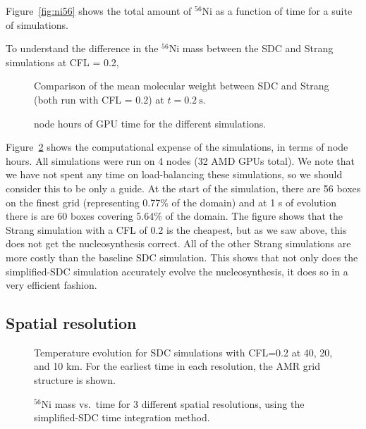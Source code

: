 \documentclass[modern]{aastex631}
\newcommand{\isot}[2]{$^{#2}\mathrm{#1}$}
\begin{document}
Figure~\ref{fig:ni56} shows the total amount of \isot{Ni}{56} as a function of time for
a suite of simulations.  

To understand the difference in the \isot{Ni}{56} mass between the SDC and Strang simulations at 
CFL = 0.2, 

\begin{figure}[t]
\centering
{}
\caption{\label{fig:abar_sdc_strang} Comparison of the mean molecular weight between SDC and Strang (both run with CFL = 0.2) at $t = 0.2~\mathrm{s}$.}
\end{figure}



\begin{figure}[t]
\centering
{}
\caption{\label{fig:cpu} node hours of GPU time for the different simulations.}
\end{figure}




Figure~\ref{fig:cpu} shows the computational expense of the
simulations, in terms of node hours.  All simulations were run on 4
nodes (32 AMD GPUs total).  We note that we have not spent any time on
load-balancing these simulations, so we should consider this to be
only a guide.  At the start of the simulation, there are 56 boxes on
the finest grid (representing 0.77\% of the domain) and at 1 s of
evolution there is are 60 boxes covering 5.64\% of the domain.  The
figure shows that the Strang simulation with a CFL of 0.2 is the
cheapest, but as we saw above, this does not get the nucleosynthesis
correct.  All of the other Strang simulations are more costly than the
baseline SDC simulation.  This shows that not only does the
simplified-SDC simulation accurately evolve the nucleosynthesis, it
does so in a very efficient fashion.

\subsection{Spatial resolution}

\begin{figure}[t]
\centering
{}
\caption{\label{fig:res_panel} Temperature evolution for SDC simulations with CFL=0.2 at 40, 20, and 10 km.  For the earliest time
  in each resolution, the AMR grid structure is shown.}
\end{figure}


\begin{figure}[t]
\centering
{}
\caption{\label{fig:res} \isot{Ni}{56} mass vs.\ time for 3 different spatial resolutions, using the simplified-SDC time integration method.}
\end{figure}
\end{document}
